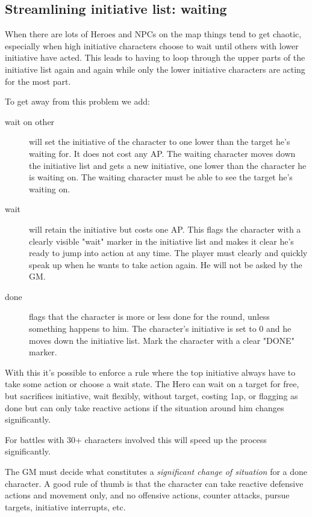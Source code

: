 \subsection*{Streamlining initiative list: waiting}
When there are lots of Heroes and NPCs on the map things tend to get chaotic, especially when high initiative characters choose to wait until others with lower initiative have acted. This leads to having to loop through the upper parts of the initiative list again and again while only the lower initiative characters are acting for the most part.

To get away from this problem we add:
\begin{description}
\item[wait on other] will set the initiative of the character to one lower than the target he's waiting for. It does not cost any AP. The waiting character moves down the initiative list and gets a new initiative, one lower than the character he is waiting on. The waiting character must be able to see the target he's waiting on.
\item[wait] will retain the initiative but costs one AP. This flags the character with a clearly visible "wait" marker in the initiative list and makes it clear he's ready to jump into action at any time. The player must clearly and quickly speak up when he wants to take action again. He will not be asked by the GM.
\item[done] flags that the character is more or less done for the round, unless something happens to him. The character's initiative is set to 0 and he moves down the initiative list. Mark the character with a clear "DONE" marker.
\end{description}

With this it's possible to enforce a rule where the top initiative always have to take some action or choose a wait state. The Hero can wait on a target for free, but sacrifices initiative, wait flexibly, without target, costing 1ap, or flagging as done but can only take reactive actions if the situation around him changes significantly.

For battles with 30+ characters involved this will speed up the process significantly.

The GM must decide what constitutes a \emph{significant change of situation} for a done character. A good rule of thumb is that the character can take reactive defensive actions and movement only, and no offensive actions, counter attacks, pursue targets, initiative interrupts, etc.

